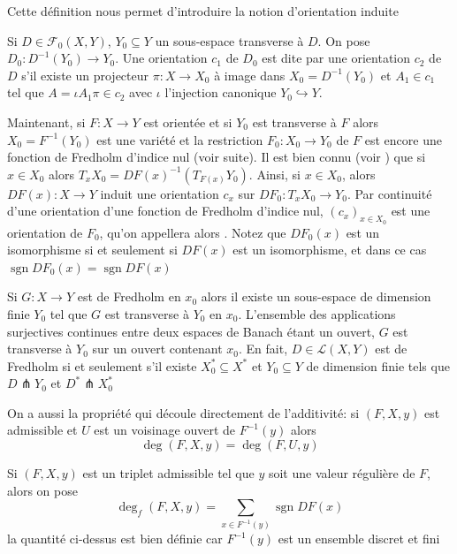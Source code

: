 \documentclass[memoire.tex]{subfiles}
\begin{document}
Cette définition nous permet d'introduire la notion d'orientation induite 
\begin{definition}
    Si $D\in \mathcal{F}_0(X,Y)$, $Y_0\subseteq Y$ 
    un sous-espace transverse à $D$. On pose $D_0: D^{-1}(Y_0)\rightarrow 
    Y_0$. Une orientation $c_1$ de $D_0$ est dite  par une orientation $c_2$ de $D$ s'il existe un projecteur $\pi:X\rightarrow 
    X_0$ à image dans $X_0= D^{-1}(Y_0)$ et $A_1\in c_1$ tel que $A=\iota 
    A_1\pi\in c_2$ avec $\iota$ l'injection canonique $Y_0\hookrightarrow 
    Y$.
\end{definition}
    Maintenant, si $F:X\rightarrow Y$ est orientée et si $Y_0$ est transverse à $F$ alors $X_0=F^{-1}(Y_0)$ est une variété et la restriction $F_0: X_0\rightarrow Y_0$ de $F$ est encore une fonction de Fredholm d'indice nul (voir suite). Il est bien connu (voir \cite{Hirsch1976DifferentialTopology}) que si $x\in X_0$ alors $T_x X_0=DF(x)^{-1}(T_{F(x)}Y_0)$. Ainsi, si $x\in X_0$, alors $DF(x):X\rightarrow Y$ induit une orientation $c_x$ sur $DF_0: T_xX_0\rightarrow Y_0$. Par continuité d'une orientation d'une fonction de Fredholm d'indice nul, $(c_x)_{x\in X_0}$ est une orientation de $F_0$, qu'on appellera alors . Notez que $DF_0(x)$ est un isomorphisme si et seulement si $DF(x)$ est un isomorphisme, et dans ce cas $\operatorname*{sgn}DF_0(x)=\operatorname*{sgn}DF(x)$
\begin{remarque}\label{rem-trans}
    Si $G:X\rightarrow Y$ est de 
    Fredholm en $x_0$ alors il 
    existe un sous-espace de 
    dimension finie $Y_0$ tel que 
    $G$ est transverse à $Y_0$ en $x_0$. 
    L'ensemble des applications 
    surjectives continues entre 
    deux espaces de Banach étant 
    un ouvert, $G$ est transverse 
    à $Y_0$ sur un ouvert 
    contenant $x_0$. En fait, 
    $D\in\mathcal{L}(X,Y)$ est de 
    Fredholm si et seulement s'il 
    existe $X_0^{*}\subseteq X^*$ 
    et $Y_0\subseteq Y$ de 
    dimension finie tels que 
    $D\pitchfork Y_0$ et $D^{*}
    \pitchfork X_0^{*}$ 
\end{remarque}

On a aussi la propriété  qui découle directement de l'additivité:
 si $(F,X,y)$ est admissible et $U$ est un voisinage ouvert de $F^{-1}(y)$ alors 
\begin{equation*}
    \deg(F,X,y)=\deg(F,U,y)
\end{equation*}

\begin{definition}
    Si $(F,X,y)$ est un triplet admissible tel que $y$ soit une valeur régulière de $F$, alors on pose
    \begin{equation*}
        \deg_f(F,X,y)=\sum_{x\in F^{-1}(y)} \operatorname{sgn}DF(x)
    \end{equation*}
    la quantité ci-dessus est bien définie car $F^{-1}(y)$ est un ensemble discret et fini
\end{definition}
\end{document}
